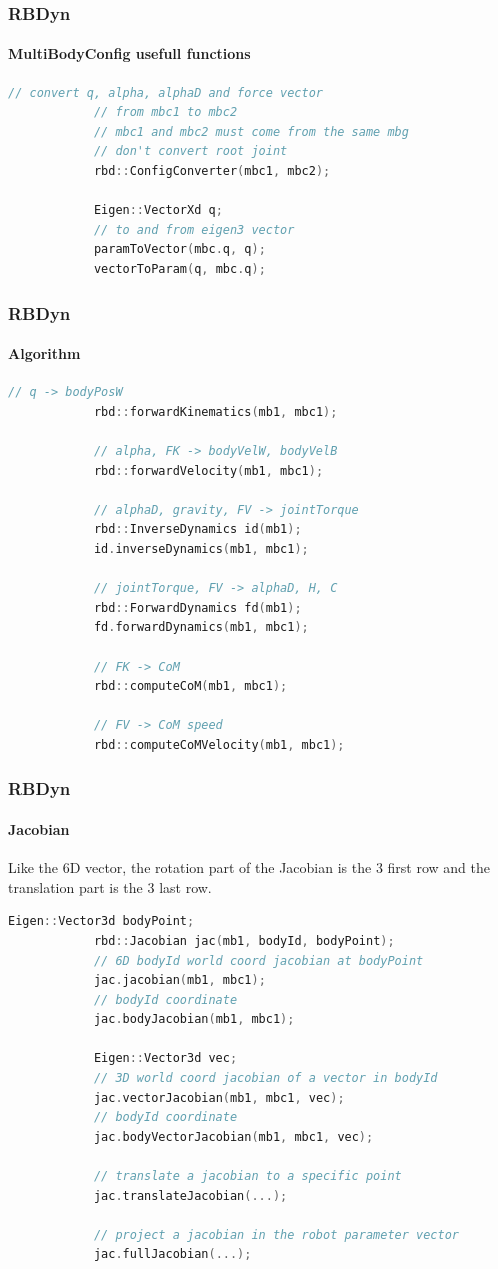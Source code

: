 \documentclass{beamer}
\begin{document}
	\begin{frame}[fragile]
		\frametitle{RBDyn}
		\framesubtitle{MultiBodyConfig usefull functions}
		\begin{lstlisting}[language=C++]
			// convert q, alpha, alphaD and force vector
			// from mbc1 to mbc2
			// mbc1 and mbc2 must come from the same mbg
			// don't convert root joint
			rbd::ConfigConverter(mbc1, mbc2);

			Eigen::VectorXd q;
			// to and from eigen3 vector
			paramToVector(mbc.q, q);
			vectorToParam(q, mbc.q);
		\end{lstlisting}
	\end{frame}

	\begin{frame}[fragile]
		\frametitle{RBDyn}
		\framesubtitle{Algorithm}
		\begin{lstlisting}[language=C++]
			// q -> bodyPosW
			rbd::forwardKinematics(mb1, mbc1);

			// alpha, FK -> bodyVelW, bodyVelB
			rbd::forwardVelocity(mb1, mbc1);

			// alphaD, gravity, FV -> jointTorque
			rbd::InverseDynamics id(mb1);
			id.inverseDynamics(mb1, mbc1);

			// jointTorque, FV -> alphaD, H, C
			rbd::ForwardDynamics fd(mb1);
			fd.forwardDynamics(mb1, mbc1);

			// FK -> CoM
			rbd::computeCoM(mb1, mbc1);

			// FV -> CoM speed
			rbd::computeCoMVelocity(mb1, mbc1);
		\end{lstlisting}
	\end{frame}

	\begin{frame}[fragile]
		\frametitle{RBDyn}
		\framesubtitle{Jacobian}
		Like the 6D vector, the rotation part of the Jacobian is the 3 first row and the translation part is the 3 last row.
		\begin{lstlisting}[language=C++]
			Eigen::Vector3d bodyPoint;
			rbd::Jacobian jac(mb1, bodyId, bodyPoint);
			// 6D bodyId world coord jacobian at bodyPoint
			jac.jacobian(mb1, mbc1);
			// bodyId coordinate
			jac.bodyJacobian(mb1, mbc1);

			Eigen::Vector3d vec;
			// 3D world coord jacobian of a vector in bodyId
			jac.vectorJacobian(mb1, mbc1, vec);
			// bodyId coordinate
			jac.bodyVectorJacobian(mb1, mbc1, vec);

			// translate a jacobian to a specific point
			jac.translateJacobian(...);

			// project a jacobian in the robot parameter vector
			jac.fullJacobian(...);
		\end{lstlisting}
	\end{frame}
\end{document}
